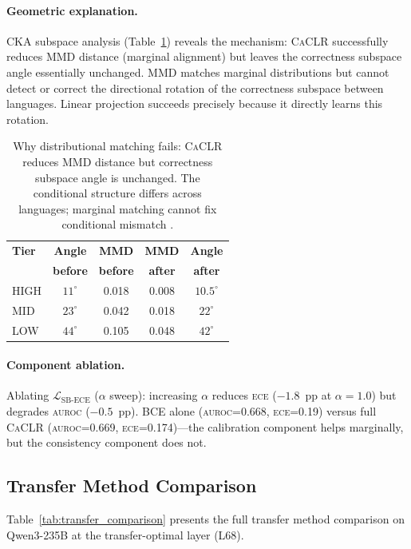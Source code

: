 \documentclass[11pt,a4paper]{article}
\newcommand{\aur}{\textsc{auroc}}
\newcommand{\ece}{\textsc{ece}}
\newcommand{\caclr}{\textsc{CaCLR}}
\newcommand{\cka}{\textsc{CKA}}
\begin{document}
\paragraph{Geometric explanation.}
\cka{} subspace analysis (Table~\ref{tab:why_fails}) reveals the mechanism: \caclr{} successfully reduces MMD distance (marginal alignment) but leaves the correctness subspace angle essentially unchanged. MMD matches marginal distributions but cannot detect or correct the directional rotation of the correctness subspace between languages. Linear projection succeeds precisely because it directly learns this rotation.

\begin{table}[t]
\centering
\small
\begin{tabular}{lcccc}
\toprule
\textbf{Tier} & \textbf{Angle} & \textbf{MMD} & \textbf{MMD} & \textbf{Angle} \\
 & \textbf{before} & \textbf{before} & \textbf{after} & \textbf{after} \\
\midrule
HIGH & $11^\circ$ & 0.018 & 0.008 & $10.5^\circ$ \\
MID  & $23^\circ$ & 0.042 & 0.018 & $22^\circ$ \\
LOW  & $44^\circ$ & 0.105 & 0.048 & $42^\circ$ \\
\bottomrule
\end{tabular}
\caption{Why distributional matching fails: \caclr{} reduces MMD distance but correctness subspace angle is unchanged. The conditional structure differs across languages; marginal matching cannot fix conditional mismatch \cite{zhao2019learning}.}
\label{tab:why_fails}
\end{table}

\paragraph{Component ablation.}
Ablating $\mathcal{L}_{\text{SB-ECE}}$ ($\alpha$ sweep): increasing $\alpha$ reduces \ece{} ($-1.8$~pp at $\alpha=1.0$) but degrades \aur{} ($-0.5$~pp). BCE alone (\aur{}=0.668, \ece{}=0.19) versus full \caclr{} (\aur{}=0.669, \ece{}=0.174)---the calibration component helps marginally, but the consistency component does not.

\subsection{Transfer Method Comparison}
\label{sec:transfer}

Table~\ref{tab:transfer_comparison} presents the full transfer method comparison on Qwen3-235B at the transfer-optimal layer (L68).
\end{document}
